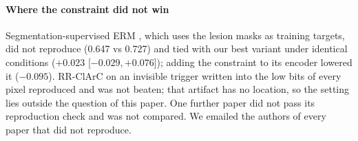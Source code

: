 \paragraph{Where the constraint did not win} Segmentation-supervised ERM \citep{saab2022spatial}, which uses the lesion
masks as training targets, did not reproduce (0.647 vs 0.727) and tied with our best variant under identical conditions
($+0.023$ [$-0.029, +0.076$]); adding the constraint to its encoder lowered it ($-0.095$). RR-ClArC on an invisible
trigger written into the low bits of every pixel \citep{dreyer2024hope} reproduced and was not beaten; that artifact has
no location, so the setting lies outside the question of this paper. One further paper \citep{pahde2023r2r} did not
pass its reproduction check and was not compared. We emailed the authors of every paper that did not reproduce.
